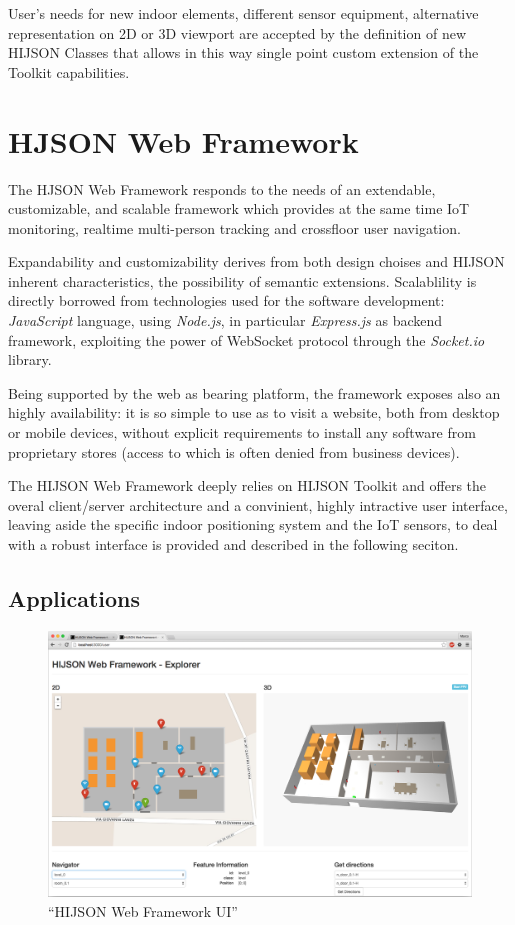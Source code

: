 \documentclass{sig-alternate}
\begin{document}
User's needs for new indoor elements, different sensor equipment,
alternative representation on 2D or 3D viewport are accepted by the
definition of new HIJSON Classes that allows in this way single point
custom extension of the Toolkit capabilities.

\section{HJSON Web Framework}\label{hjson-web-framework}

The HJSON Web Framework responds to the needs of an extendable,
customizable, and scalable framework which provides at the same time IoT
monitoring, realtime multi-person tracking and crossfloor user
navigation.

Expandability and customizability derives from both design choises and
HIJSON inherent characteristics, the possibility of semantic extensions.
Scalablility is directly borrowed from technologies used for the
software development: \emph{JavaScript} language, using \emph{Node.js},
in particular \emph{Express.js} as backend framework, exploiting the
power of WebSocket protocol through the \emph{Socket.io} library.

Being supported by the web as bearing platform, the framework exposes
also an highly availability: it is so simple to use as to visit a
website, both from desktop or mobile devices, without explicit
requirements to install any software from proprietary stores (access to
which is often denied from business devices).

The HIJSON Web Framework deeply relies on HIJSON Toolkit and offers the
overal client/server architecture and a convinient, highly intractive
user interface, leaving aside the specific indoor positioning system and
the IoT sensors, to deal with a robust interface is provided and
described in the following seciton.

\subsection{Applications}\label{applications}

\begin{figure}[!hb]
\centering
\includegraphics[width=\textwidth]{images/web-framework.png}
\caption{``HIJSON Web Framework UI''}
\label{fig:web-framework-ui}
\end{figure}
\end{document}

